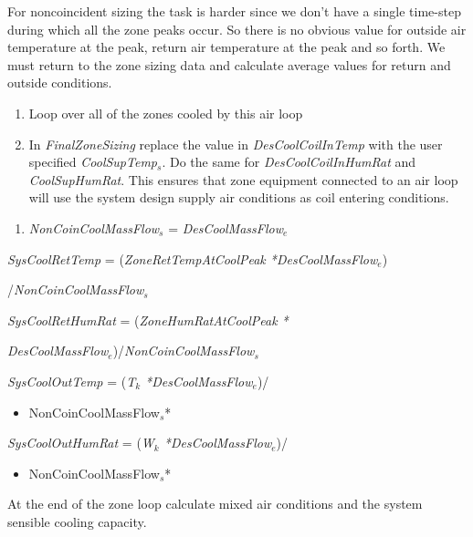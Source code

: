 For noncoincident sizing the task is harder since we don't have a single time-step during which all the zone peaks occur. So there is no obvious value for outside air temperature at the peak, return air temperature at the peak and so forth. We must return to the zone sizing data and calculate average values for return and outside conditions.

\begin{enumerate}
\def\labelenumi{(\alph{enumi})}
\setcounter{enumi}{1}
\item
  Loop over all of the zones cooled by this air loop
\item
  In \emph{FinalZoneSizing} replace the value in \emph{DesCoolCoilInTemp} with the user specified \emph{CoolSupTemp\(_{s}\)}. Do the same for \emph{DesCoolCoilInHumRat} and \emph{CoolSupHumRat}. This ensures that zone equipment connected to an air loop will use the system design supply air conditions as coil entering conditions. 
\end{enumerate}

\begin{enumerate}
\def\labelenumi{(\roman{enumi})}
\setcounter{enumi}{1}
\tightlist
\item
  \emph{NonCoinCoolMassFlow\(_{s}\)} = \emph{DesCoolMassFlow\(_{e}\)}
\end{enumerate}

\emph{SysCoolRetTemp} = (\emph{ZoneRetTempAtCoolPeak *DesCoolMassFlow\(_{e}\)})

/\emph{NonCoinCoolMassFlow\(_{s}\)}

\emph{SysCoolRetHumRat} = (\emph{ZoneHumRatAtCoolPeak *}

\emph{DesCoolMassFlow\(_{e}\)})/\emph{NonCoinCoolMassFlow\(_{s}\)}

\emph{SysCoolOutTemp} = (\emph{T\(_{k}\) *DesCoolMassFlow\(_{e}\)})/

\begin{itemize}
\tightlist
\item
  NonCoinCoolMassFlow\(_{s}\)*
\end{itemize}

\emph{SysCoolOutHumRat} = (\emph{W\(_{k}\) *DesCoolMassFlow\(_{e}\)})/

\begin{itemize}
\tightlist
\item
  NonCoinCoolMassFlow\(_{s}\)*
\end{itemize}

At the end of the zone loop calculate mixed air conditions and the system sensible cooling capacity.

